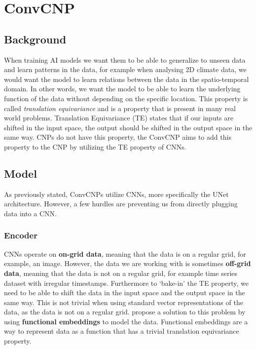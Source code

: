 \documentclass[../../main.tex]{subfiles}
\begin{document}
\section{ConvCNP}

\subsection{Background}

When training AI models we want them to be able to generalize to unseen data and learn patterns in the data, for example when analysing 2D climate data, we would want the model to learn relations between the data in the spatio-temporal domain. In other words, we want the model to be able to learn the underlying function of the data without depending on the specific location. This property is called \textit{translation equivariance} and is a property that is present in many real world problems. Translation Equivariance (TE) states that if our inputs are shifted in the input space, the output should be shifted in the output space in the same way. CNPs do not have this property, the ConvCNP aims to add this property to the CNP by utilizing the TE property of CNNs.

\subsection{Model}

As previously stated, ConvCNPs \cite{gordon2020convolutional} utilize CNNs, more specifically the UNet architecture. However, a few hurdles are preventing us from directly plugging data into a CNN.

\subsubsection{Encoder}

CNNs operate on \textbf{on-grid data}, meaning that the data is on a regular grid, for example, an image. However, the data we are working with is sometimes \textbf{off-grid data}, meaning that the data is not on a regular grid, for example time series dataset with irregular timestamps. Furthermore to `bake-in' the TE property, we need to be able to shift the data in the input space and the output space in the same way. This is not trivial when using standard vector representations of the data, as the data is not on a regular grid. \cite{gordon2020convolutional} propose a solution to this problem by using \textbf{functional embeddings} to model the data. Functional embeddings are a way to represent data as a function that has a trivial translation equivariance property. 
\end{document}
